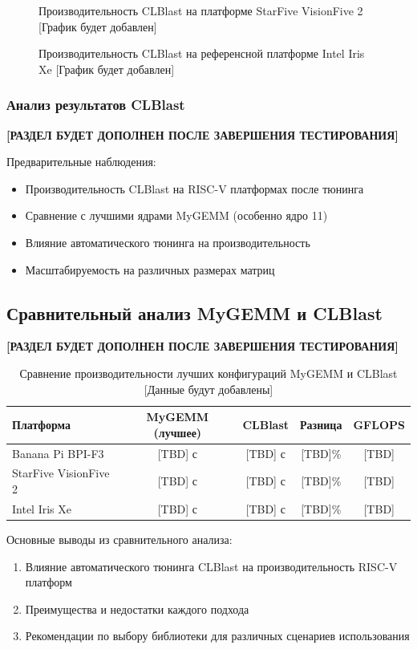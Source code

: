 \begin{figure}[H]
\centering
\caption{Производительность CLBlast на платформе StarFive VisionFive 2 [График будет добавлен]}
\label{fig:clblast_starfive}
\end{figure}

\begin{figure}[H]
\centering
\caption{Производительность CLBlast на референсной платформе Intel Iris Xe [График будет добавлен]}
\label{fig:clblast_intelxe}
\end{figure}

\subsubsection{Анализ результатов CLBlast}

\textbf{[РАЗДЕЛ БУДЕТ ДОПОЛНЕН ПОСЛЕ ЗАВЕРШЕНИЯ ТЕСТИРОВАНИЯ]}

Предварительные наблюдения:

\begin{itemize}
    \item Производительность CLBlast на RISC-V платформах после тюнинга
    \item Сравнение с лучшими ядрами MyGEMM (особенно ядро 11)
    \item Влияние автоматического тюнинга на производительность
    \item Масштабируемость на различных размерах матриц
\end{itemize}

\subsection{Сравнительный анализ MyGEMM и CLBlast}

\textbf{[РАЗДЕЛ БУДЕТ ДОПОЛНЕН ПОСЛЕ ЗАВЕРШЕНИЯ ТЕСТИРОВАНИЯ]}

\begin{table}[H]
\centering
\caption{Сравнение производительности лучших конфигураций MyGEMM и CLBlast [Данные будут добавлены]}
\label{tab:performance_comparison}
\begin{tabular}{lcccc}
\hline
\textbf{Платформа} & \textbf{MyGEMM (лучшее)} & \textbf{CLBlast} & \textbf{Разница} & \textbf{GFLOPS} \\
\hline
Banana Pi BPI-F3 & [TBD] с & [TBD] с & [TBD]\% & [TBD] \\
StarFive VisionFive 2 & [TBD] с & [TBD] с & [TBD]\% & [TBD] \\
Intel Iris Xe & [TBD] с & [TBD] с & [TBD]\% & [TBD] \\
\hline
\end{tabular}
\end{table}

Основные выводы из сравнительного анализа:

\begin{enumerate}
    \item Влияние автоматического тюнинга CLBlast на производительность RISC-V платформ
    \item Преимущества и недостатки каждого подхода
    \item Рекомендации по выбору библиотеки для различных сценариев использования
\end{enumerate}
